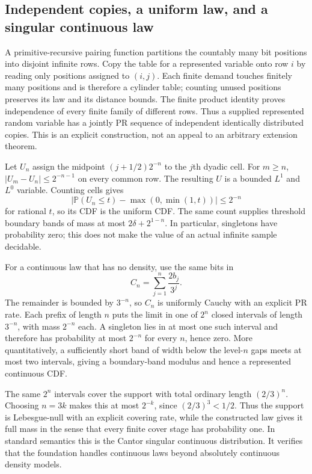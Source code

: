 \subsection{Independent copies, a uniform law, and a singular continuous law}

A primitive-recursive pairing function partitions the countably many bit
positions into disjoint infinite rows. Copy the table for a represented
variable onto row $i$ by reading only positions assigned to $(i,j)$. Each
finite demand touches finitely many positions and is therefore a cylinder
table; counting unused positions preserves its law and its distance bounds.
The finite product identity proves independence of every finite family of
different rows. Thus a supplied represented random variable has a jointly
PR sequence of independent identically distributed copies. This is an explicit
construction, not an appeal to an arbitrary extension theorem.

Let $U_n$ assign the midpoint $(j+1/2)2^{-n}$ to the $j$th dyadic cell.
For $m\ge n$, $|U_m-U_n|\le2^{-n-1}$ on every common row. The resulting
$U$ is a bounded $L^1$ and $L^0$ variable. Counting cells gives
\[
 \left|\mathbb P(U_n\le t)-\max(0,\min(1,t))\right|\le2^{-n}
\]
for rational $t$, so its CDF is the uniform CDF. The same count supplies
threshold boundary bands of mass at most $2\delta+2^{1-n}$. In particular,
singletons have probability zero; this does not make the value of an actual
infinite sample decidable.

For a continuous law that has no density, use the same bits in
\[
 C_n=\sum_{j=1}^n\frac{2b_j}{3^j}.
\]
The remainder is bounded by $3^{-n}$, so $C_n$ is uniformly Cauchy with an
explicit PR rate. Each prefix of length $n$ puts the limit in one of $2^n$
closed intervals of length $3^{-n}$, with mass $2^{-n}$ each. A singleton
lies in at most one such interval and therefore has probability at most
$2^{-n}$ for every $n$, hence zero. More quantitatively, a sufficiently short
band of width below the level-$n$ gaps meets at most two intervals, giving
a boundary-band modulus and hence a represented continuous CDF.

The same $2^n$ intervals cover the support with total ordinary length
$(2/3)^n$. Choosing $n=3k$ makes this at most $2^{-k}$, since
$(2/3)^3<1/2$. Thus the support is Lebesgue-null with an explicit covering
rate, while the constructed law gives it full mass in the sense that every
finite cover stage has probability one. In standard semantics this is the
Cantor singular continuous distribution. It verifies that the foundation
handles continuous laws beyond absolutely continuous density models.

